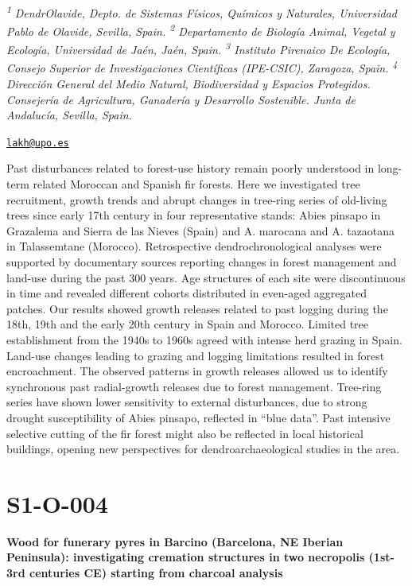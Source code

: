 \documentclass[
]{book}
\begin{document}
\textsuperscript{\emph{1}} \emph{DendrOlavide, Depto. de Sistemas Físicos, Químicos y Naturales, Universidad Pablo de Olavide, Sevilla, Spain. \textsuperscript{2} Departamento de Biología Animal, Vegetal y Ecología, Universidad de Jaén, Jaén, Spain. \textsuperscript{3} Instituto Pirenaico De Ecología, Consejo Superior de Investigaciones Científicas (IPE-CSIC), Zaragoza, Spain. \textsuperscript{4} Dirección General del Medio Natural, Biodiversidad y Espacios Protegidos. Consejería de Agricultura, Ganadería y Desarrollo Sostenible. Junta de Andalucía, Sevilla, Spain.}

\href{mailto:lakh@upo.es}{\nolinkurl{lakh@upo.es}}

Past disturbances related to forest-use history remain poorly understood in long-term related Moroccan and Spanish fir forests. Here we investigated tree recruitment, growth trends and abrupt changes in tree-ring series of old-living trees since early 17th century in four representative stands: Abies pinsapo in Grazalema and Sierra de las Nieves (Spain) and A. marocana and A. tazaotana in Talassemtane (Morocco). Retrospective dendrochronological analyses were supported by documentary sources reporting changes in forest management and land-use during the past 300 years. Age structures of each site were discontinuous in time and revealed different cohorts distributed in even-aged aggregated patches. Our results showed growth releases related to past logging during the 18th, 19th and the early 20th century in Spain and Morocco. Limited tree establishment from the 1940s to 1960s agreed with intense herd grazing in Spain. Land-use changes leading to grazing and logging limitations resulted in forest encroachment. The observed patterns in growth releases allowed us to identify synchronous past radial-growth releases due to forest management. Tree-ring series have shown lower sensitivity to external disturbances, due to strong drought susceptibility of Abies pinsapo, reflected in ``blue data''. Past intensive selective cutting of the fir forest might also be reflected in local historical buildings, opening new perspectives for dendroarchaeological studies in the area.

\hypertarget{s1-o-004}{%
\section*{S1-O-004}\label{s1-o-004}}

\textbf{Wood for funerary pyres in Barcino (Barcelona, NE Iberian Peninsula): investigating cremation structures in two necropolis (1st-3rd centuries CE) starting from charcoal analysis}
\end{document}
